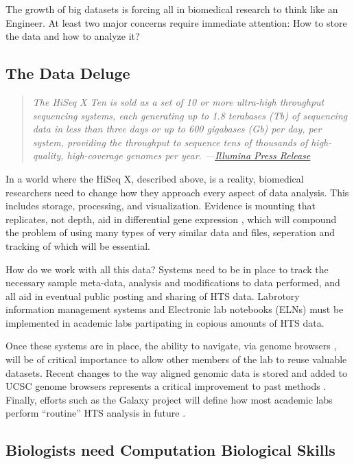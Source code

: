     The growth of big datasets is forcing all in biomedical research to think like an Engineer. At least two major concerns require immediate attention: How to store the data and how to analyze it?

  \subsection{The Data Deluge}
    \label{Disc:subsec:Dealing with Data Deluge}

    \begin{quote}
      \itshape
      \singlespacing
      The HiSeq X Ten is sold as a set of 10 or more ultra-high throughput sequencing systems, each generating up to 1.8 terabases (Tb) of sequencing data in less than three days or up to 600 gigabases (Gb) per day, per system, providing the throughput to sequence tens of thousands of high-quality, high-coverage genomes per year. ---\href{http://bit.ly/PZpegZ}{Illumina Press Release}
      \end{quote}

    In a world where the HiSeq X, described above, is a reality, biomedical researchers need to change how they approach every aspect of data analysis. This includes storage, processing, and visualization. Evidence is mounting that replicates, not depth, aid in differential gene expression \citep{Liu2014}, which will compound the problem of using many types of very similar data and files, seperation and tracking of which will be essential.

    How do we work with all this data? Systems need to be in place to track the necessary sample meta-data, analysis and modifications to data performed, and all aid in eventual public posting and sharing of HTS data. Labrotory information management systems and Electronic lab notebooks (ELNs) must be implemented in academic labs partipating in copious amounts of HTS data.

    Once these systems are in place, the ability to navigate, via genome browsers \citep{Zweig2008,Robinson2011}, will be of critical importance to allow other members of the lab to reuse valuable datasets. Recent changes to the way aligned genomic data is stored and added to UCSC genome browsers represents a critical improvement to past methods \citep{Raney2013}. Finally, efforts such as the Galaxy project  will define how most academic labs perform ``routine'' HTS analysis in future \citep{Blankenberg2010}.

  \subsection{Biologists need Computation Biological Skills}
    \label{Disc:subsec:Biologists need Comp Skills}


